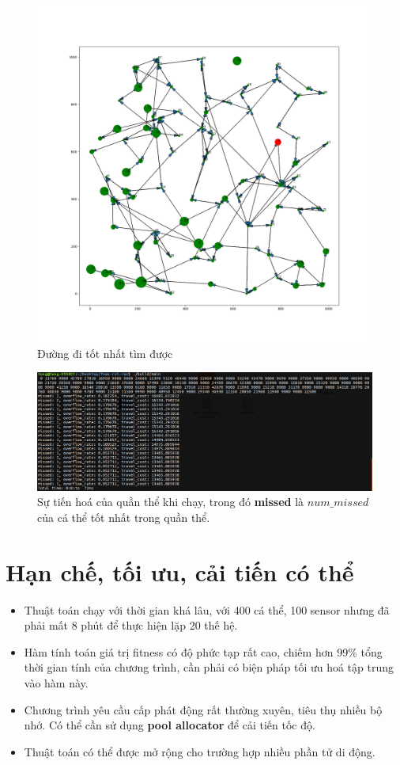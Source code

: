 \documentclass[12pt]{report}
\begin{document}
\begin{figure}[H]
\centering
\caption{Đường đi tốt nhất tìm được}
\includegraphics[width=\textwidth]{path.png}
\end{figure}

\begin{figure}[H]
\centering
\caption{Sự tiến hoá của quần thể khi chạy, trong đó \textbf{missed} là $num\_missed$ của cá thể tốt nhất trong quần thể.}
\includegraphics[width=\textwidth]{run.png}
\end{figure}

\section{Hạn chế, tối ưu, cải tiến có thể}
\begin{itemize}
\item Thuật toán chạy với thời gian khá lâu, với 400 cá thể, 100 sensor nhưng đã phải mất 8 phút để thực hiện lặp 20 thế hệ. 
\item Hàm tính toán giá trị fitness có độ phức tạp rất cao, chiếm hơn 99\% tổng thời gian tính của chương trình, cần phải có biện pháp tối ưu hoá tập trung vào hàm này.
\item Chương trình yêu cầu cấp phát động rất thường xuyên, tiêu thụ nhiều bộ nhớ. Có thể cần sử dụng \textbf{pool allocator} để cải tiến tốc độ. 
\item Thuật toán có thể được mở rộng cho trường hợp nhiều phần tử di động. 
\end{itemize}
\end{document}
